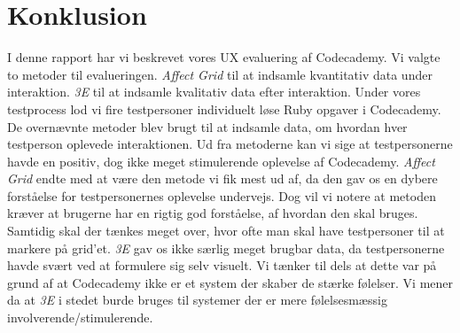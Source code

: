 \chapter{Konklusion}\label{ch:konk}
I denne rapport har vi beskrevet vores UX evaluering af Codecademy. Vi valgte to metoder til evalueringen. \textit{Affect Grid} til at indsamle kvantitativ data under interaktion. \textit{3E} til at indsamle kvalitativ data efter interaktion. Under vores testprocess lod vi fire testpersoner individuelt løse Ruby opgaver i Codecademy. De overnævnte metoder blev brugt til at indsamle data, om hvordan hver testperson oplevede interaktionen. Ud fra metoderne kan vi sige at testpersonerne havde en positiv, dog ikke meget stimulerende oplevelse af Codecademy. \textit{Affect Grid} endte med at være den metode vi fik mest ud af, da den gav os en dybere forståelse for testpersonernes oplevelse undervejs. Dog vil vi notere at metoden kræver at brugerne har en rigtig god forståelse, af hvordan den skal bruges. Samtidig skal der tænkes meget over, hvor ofte man skal have testpersoner til at markere på grid'et. \textit{3E} gav os ikke særlig meget brugbar data, da testpersonerne havde svært ved at formulere sig selv visuelt. Vi tænker til dels at dette var på grund af at Codecademy ikke er et system der skaber de stærke følelser. Vi mener da at \textit{3E} i stedet burde bruges til systemer der er mere følelsesmæssig involverende/stimulerende. 

